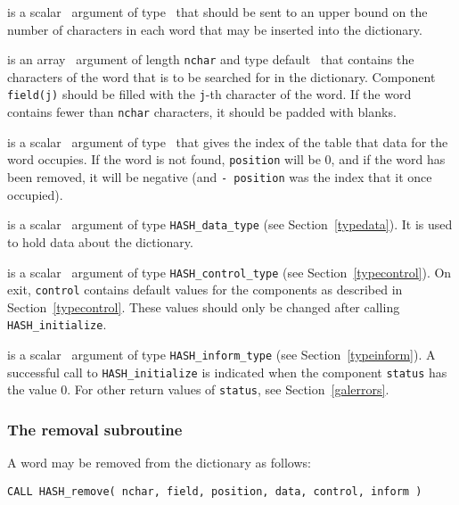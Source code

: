 \documentclass{galahad}
\newcommand{\packagename}{HASH}
\begin{document}
\vspace*{-2mm}
\begin{description}

 is a scalar \intentin\ argument of type \integer\ that
should be sent to an upper bound on the number of characters in each
word that may be inserted into the dictionary.

 is an array \intentin\ argument of length {\tt nchar} and 
type default \character\ that contains the characters of the word that 
is to be searched for in the dictionary.  
Component {\tt field(j)} should be filled with the {\tt j}-th 
character of the word. If the word contains fewer than {\tt nchar} characters,
it should be padded with blanks.

 is a scalar \intentout\ argument of type \integer\ that
gives the index of the table that data for the word occupies. If the word is
not found, {\tt position} will be 0, and if the word has been removed, it will
be negative (and {\tt - position} was the index that it once occupied).

 is a scalar \intentinout\ argument of type
{\tt \packagename\_data\_type}
(see Section~\ref{typedata}). It is used to hold data about the dictionary.

 is a scalar \intentin\ argument of type
{\tt \packagename\_control\_type}
(see Section~\ref{typecontrol}).
On exit, {\tt control} contains default values for the components as
described in Section~\ref{typecontrol}.
These values should only be changed after calling
{\tt \packagename\_initialize}.

 is a scalar \intentinout\ argument of type
{\tt \packagename\_inform\_type}
(see Section~\ref{typeinform}). A successful call to
{\tt \packagename\_initialize}
is indicated when the  component {\tt status} has the value 0.
For other return values of {\tt status}, see Section~\ref{galerrors}.

\end{description}


\subsubsection{The removal subroutine}\label{subremove}
A word may be removed from the dictionary as follows:
\vspace*{1mm}

\hspace{8mm}
{\tt CALL \packagename\_remove( nchar, field, position, data, control, inform )}
\end{document}
